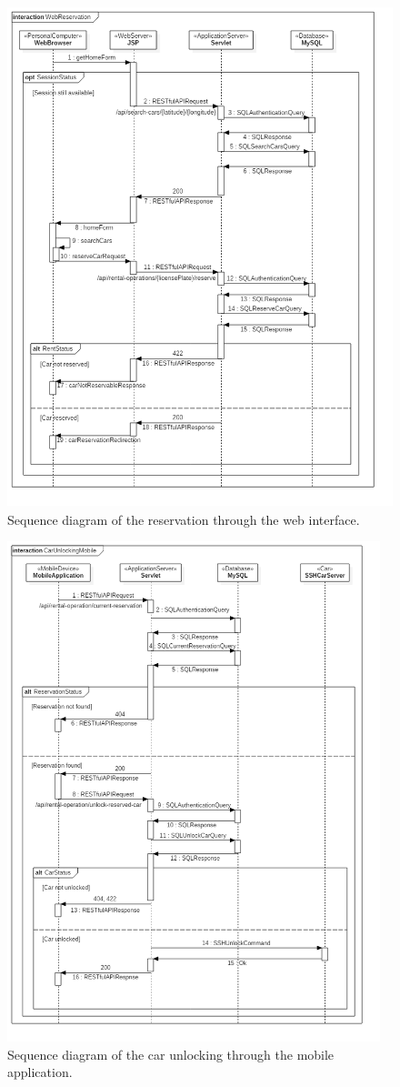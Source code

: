 \begin{figure}[H]
	\noindent
    	\centering
    	\includegraphics[height=550px, keepaspectratio]{diagrams/SequenceReservation.png}
	\caption{Sequence diagram of the reservation through the web interface.}
    	\label{fig:sequence-reservation}
\end{figure}

\begin{figure}[H]
	\noindent
    	\centering
    	\includegraphics[height=550px, keepaspectratio]{diagrams/SequenceCarUnlocking.png}
	\caption{Sequence diagram of the car unlocking through the mobile application.}
    	\label{fig:sequence-unlocking}
\end{figure}

